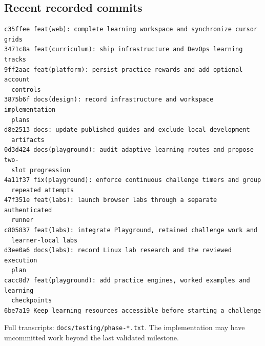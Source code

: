 \subsection*{Recent recorded commits}
\begin{verbatim}
c35ffee feat(web): complete learning workspace and synchronize cursor grids
3471c8a feat(curriculum): ship infrastructure and DevOps learning tracks
9ff2aac feat(platform): persist practice rewards and add optional account
  controls
3875b6f docs(design): record infrastructure and workspace implementation
  plans
d8e2513 docs: update published guides and exclude local development
  artifacts
0d3d424 docs(playground): audit adaptive learning routes and propose two-
  slot progression
4a11f37 fix(playground): enforce continuous challenge timers and group
  repeated attempts
47f351e feat(labs): launch browser labs through a separate authenticated
  runner
c805837 feat(labs): integrate Playground, retained challenge work and
  learner-local labs
d3ee0a6 docs(labs): record Linux lab research and the reviewed execution
  plan
cacc8d7 feat(playground): add practice engines, worked examples and learning
  checkpoints
6be7a19 Keep learning resources accessible before starting a challenge
\end{verbatim}
\noindent Full transcripts: \texttt{docs/testing/phase-*.txt}. The implementation may have uncommitted work beyond the last validated milestone.
